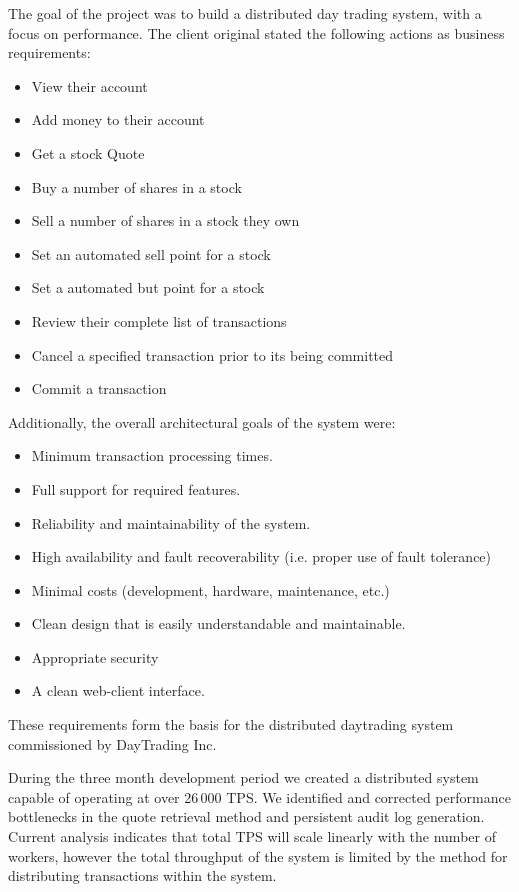 \begin{Overview}

The goal of the project was to build a distributed day trading system, with a focus on performance.
The client original stated the following actions as business requirements:

\begin{itemize}
  \item View their account
  \item Add money to their account
  \item Get a stock Quote
  \item Buy a number of shares in a stock
  \item Sell a number of shares in a stock they own
  \item Set an automated sell point for a stock
  \item Set a automated but point for a stock
  \item Review their complete list of transactions
  \item Cancel a specified transaction prior to its being committed
  \item Commit a transaction
\end{itemize} 

\noindent Additionally, the overall architectural goals of the system were:
\begin{itemize}
  \item Minimum transaction processing times. 
  \item Full support for required features. 
  \item Reliability and maintainability of the system. 
  \item High availability and fault recoverability (i.e. proper use of fault tolerance) 
  \item Minimal costs (development, hardware, maintenance, etc.) 
  \item Clean design that is easily understandable and maintainable. 
  \item Appropriate security 
  \item A clean web-client interface. 
\end{itemize}

These requirements form the basis for the distributed daytrading system commissioned by DayTrading Inc.

During the three month development period we created a distributed system capable of operating at over 26\,000 TPS.
We identified and corrected performance bottlenecks in the quote retrieval method and persistent audit log generation.
Current analysis indicates that total TPS will scale linearly with the number of workers, however the total throughput of the system is limited by the method for distributing transactions within the system.



\end{Overview}
